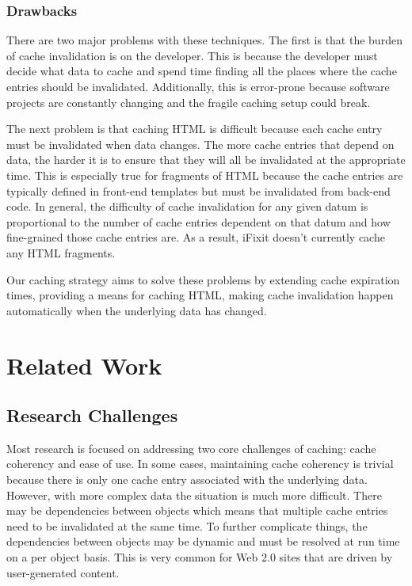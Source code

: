 \documentclass[12pt]{ucthesis}
\begin{document}
\subsubsection{Drawbacks}
There are two major problems with these techniques.
The first is that the burden of cache invalidation is on the developer.
This is because the developer must decide what data to cache and spend time finding all the places where the cache entries should be invalidated.
Additionally, this is error-prone because software projects are constantly changing and the fragile caching setup could break.

The next problem is that caching HTML is difficult because each cache entry must be invalidated when data changes.
The more cache entries that depend on data, the harder it is to ensure that they will all be invalidated at the appropriate time.
This is especially true for fragments of HTML because the cache entries are typically defined in front-end templates but must be invalidated from back-end code.
In general, the difficulty of cache invalidation for any given datum is proportional to the number of cache entries dependent on that datum and how fine-grained those cache entries are.
As a result, \textsf{iFixit} doesn't currently cache any HTML fragments.

Our caching strategy aims to solve these problems by extending cache expiration times, providing a means for caching HTML, making cache invalidation happen automatically when the underlying data has changed.

\section{Related Work}
\subsection{Research Challenges}
Most research is focused on addressing two core challenges of caching: cache coherency and ease of use.
In some cases, maintaining cache coherency is trivial because there is only one cache entry associated with the underlying data.
However, with more complex data the situation is much more difficult.
There may be dependencies between objects which means that multiple cache entries need to be invalidated at the same time.
To further complicate things, the dependencies between objects may be dynamic and must be resolved at run time on a per object basis.
This is very common for Web 2.0 sites that are driven by user-generated content.
\end{document}
